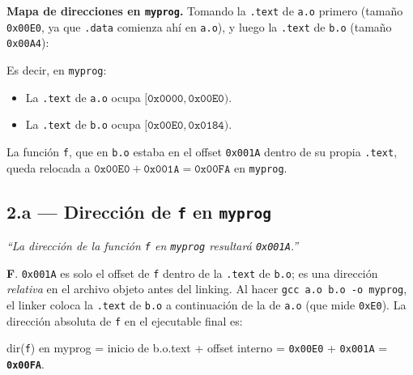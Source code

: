 \documentclass[11pt,a4paper]{article}
\begin{document}
\textbf{Mapa de direcciones en \texttt{myprog}.} Tomando la
\texttt{.text} de \texttt{a.o} primero (tamaño \texttt{0x00E0}, ya que
\texttt{.data} comienza ahí en \texttt{a.o}), y luego la
\texttt{.text} de \texttt{b.o} (tamaño \texttt{0x00A4}):

\begin{center}
\end{center}

Es decir, en \texttt{myprog}:

\begin{itemize}[leftmargin=*,nosep]
    \item La \texttt{.text} de \texttt{a.o} ocupa
        $[\texttt{0x0000}, \texttt{0x00E0})$.
    \item La \texttt{.text} de \texttt{b.o} ocupa
        $[\texttt{0x00E0}, \texttt{0x0184})$.
\end{itemize}

La función \texttt{f}, que en \texttt{b.o} estaba en el offset
\texttt{0x001A} dentro de su propia \texttt{.text}, queda relocada a
$\texttt{0x00E0} + \texttt{0x001A} = \texttt{0x00FA}$ en
\texttt{myprog}.

\subsection*{2.a --- Dirección de \texttt{f} en \texttt{myprog}}

\emph{``La dirección de la función \texttt{f} en \texttt{myprog}
resultará \texttt{0x001A}.''}

\begin{respuesta}
\textbf{F}. \texttt{0x001A} es solo el offset de \texttt{f} dentro de
la \texttt{.text} de \texttt{b.o}; es una dirección \emph{relativa} en
el archivo objeto antes del linking. Al hacer
\texttt{gcc a.o b.o -o myprog}, el linker coloca la \texttt{.text} de
\texttt{b.o} a continuación de la de \texttt{a.o} (que mide
\texttt{0xE0}). La dirección absoluta de \texttt{f} en el ejecutable
final es:

\quad dir(\texttt{f}) en myprog = inicio de b.o.text + offset interno
                                 = \texttt{0x00E0} + \texttt{0x001A}
                                 = \textbf{\texttt{0x00FA}}.
\end{respuesta}
\end{document}
